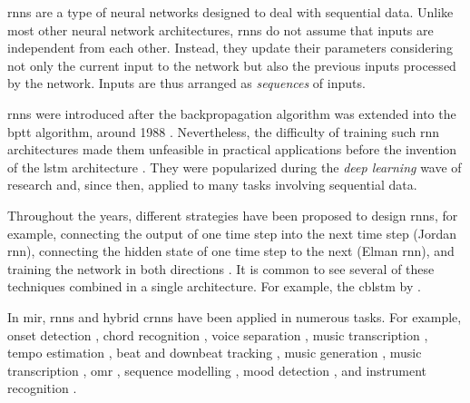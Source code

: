 

\glspl{rnn} are a type of neural networks designed to deal
with sequential data. Unlike most other neural network
architectures, \glspl{rnn} do not assume that inputs are
independent from each other. Instead, they update their
parameters considering not only the current input to the
network but also the previous inputs processed by the
network. Inputs are thus arranged as \emph{sequences} of
inputs.

\glspl{rnn} were introduced after the backpropagation
algorithm \parencite{rumelhart1988learning} was extended
into the \gls{bptt} algorithm, around 1988
\parencite{werbos1988generalization,
werbos1990backpropagation}. Nevertheless, the difficulty of
training such \gls{rnn} architectures made them unfeasible
in practical applications before the invention of the
\gls{lstm} architecture \parencite{hochreiter1997long}. They
were popularized during the \emph{deep learning} wave of
research and, since then, applied to many tasks involving
sequential data.

Throughout the years, different strategies have been
proposed to design \glspl{rnn}, for example, connecting the
output of one time step into the next time step (Jordan
\gls{rnn}), connecting the hidden state of one time step to
the next (Elman \gls{rnn}), and training the network in both
directions \parencite{schuster1997bidirectional}. It is
common to see several of these techniques combined in a
single architecture. For example, the \gls{cblstm} by
\textcite{vogl2017drum}.

In \gls{mir}, \glspl{rnn} and hybrid \glspl{crnn} have been
applied in numerous tasks. For example, onset detection
\parencite{eyben2010universal}, chord recognition
\parencite{boulangerlewandowski2013audio, sigtia2016endend,
sears2018evaluating}, voice separation
\parencite{huang2014singingvoice}, music transcription
\parencite{sigtia2014rnnbased}, tempo estimation
\parencite{bock2015accurate}, beat and downbeat tracking
\parencite{bock2016joint, krebs2016downbeat}, music
generation \parencite{liu2016predicting, liang2017automatic,
lim2017chord}, music transcription
\parencite{rigaud2016singing, sigtia2016endend,
southall2016automatic, vogl2016recurrent,
southall2017automatic, vogl2017drum, basaran2018main},
\gls{omr} \parencite{calvozaragoza2017onestep,
wel2017optical, calvozaragoza2018cameraprimus}, sequence
modelling \parencite{ycart2017study}, mood detection
\parencite{delbouys2018music}, and instrument recognition
\parencite{gururani2018instrument}.



